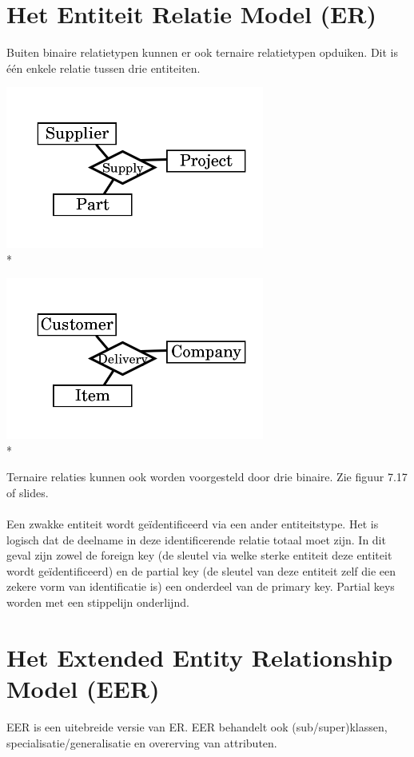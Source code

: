 \documentclass[10pt]{article}
\begin{document}
\section{Het Entiteit Relatie Model (ER)}
Buiten binaire relatietypen kunnen er ook ternaire relatietypen opduiken. Dit is \'e\'en enkele relatie tussen drie entiteiten.
\begin{center}
\includegraphics[width=85mm]{TernaireRelatie.png}\\*
\end{center}
\begin{center}
\includegraphics[width=85mm]{TernaireRelatie2.png}\\*
\end{center}
Ternaire relaties kunnen ook worden voorgesteld door drie binaire. Zie figuur 7.17 of slides.\\\\
Een zwakke entiteit wordt ge\"identificeerd via een ander entiteitstype. Het is logisch dat de deelname in deze identificerende relatie totaal moet zijn. In dit geval zijn zowel de foreign key (de sleutel via welke sterke entiteit deze entiteit wordt ge\"identificeerd) en de partial key (de sleutel van deze entiteit zelf die een zekere vorm van identificatie is) een onderdeel van de primary key. Partial keys worden met een stippelijn onderlijnd.
\section{Het Extended Entity Relationship Model (EER)}
EER is een uitebreide versie van ER. EER behandelt ook (sub/super)klassen, specialisatie/generalisatie en overerving van attributen.
\end{document}
